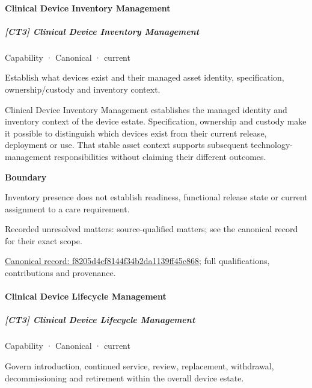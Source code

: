 \paragraph{Clinical Device Inventory Management}

\subparagraph{[CT3] Clinical Device Inventory Management}

\label{element:f8205d4cf8144f34b2da1139ff45c868}
{\small Capability · Canonical · current}\par

Establish what devices exist and their managed asset identity, specification, ownership/custody and inventory context.



Clinical Device Inventory Management establishes the managed identity and inventory context of the device estate. Specification, ownership and custody make it possible to distinguish which devices exist from their current release, deployment or use. That stable asset context supports subsequent technology-management responsibilities without claiming their different outcomes.



\textbf{Boundary}



Inventory presence does not establish readiness, functional release state or current assignment to a care requirement.


{\small Recorded unresolved matters: source-qualified matters; see the canonical record for their exact scope.}\par
{\footnotesize \href{../../../../continuum/strategy/capability/f8205d4cf8144f34b2da1139ff45c868.md}{Canonical record: f8205d4cf8144f34b2da1139ff45c868}; full qualifications, contributions and provenance.}\par
\paragraph{Clinical Device Lifecycle Management}

\subparagraph{[CT3] Clinical Device Lifecycle Management}

\label{element:186667f5a3844d10a236af73bc91a0de}
{\small Capability · Canonical · current}\par

Govern introduction, continued service, review, replacement, withdrawal, decommissioning and retirement within the overall device estate.



